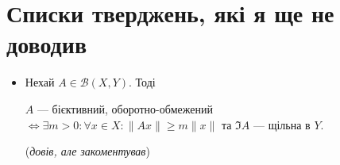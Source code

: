 \documentclass[a4paper, 10pt]{article}
\def\rightproof{$\boxed{\Rightarrow}$ }
\def\leftproof{$\boxed{\Leftarrow}$ }
\theoremstyle{theoremdd}
\theoremstyle{theoremdd}
\theoremstyle{theoremdd}
\theoremstyle{theoremdd}
\theoremstyle{theoremdd}
\theoremstyle{theoremdd}
\theoremstyle{theoremdd}
\theoremstyle{theoremdd}
\begin{document}
\section*{Списки тверджень, які я ще не доводив}
\begin{itemize}[wide=0pt]
\item Нехай $A \in \mathcal{B}(X,Y)$. Тоді
\begin{center}
$A$ --- бієктивний, оборотно-обмежений $\iff \exists m > 0: \forall x \in X: \|Ax\| \geq m \|x\|$ та $\Im A$ --- щільна в $Y$.
\end{center}
(\textit{довів, але закоментував})

\end{itemize}
\end{document}
